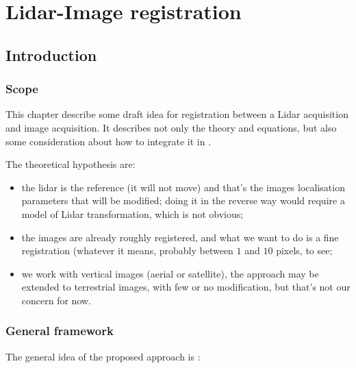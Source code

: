 \chapter{Lidar-Image registration}
\label{Chap:LidImRed}



\section{Introduction}

\subsection{Scope}

This chapter describe some draft idea for registration  between a Lidar
acquisition and image acquisition.  It describes not only the theory and equations,
but also some consideration about how to integrate it in \PPP.

The theoretical hypothesis are:

\begin{itemize}
   \item  the lidar is the reference (it will not move) and that's the images localisation parameters that will be modified; doing it in the reverse way would require
          a model of Lidar transformation, which is not obvious;

   \item  the images are already roughly registered, and what we want to do is a fine 
          registration (whatever it means, probably between $1$ and $10$ pixels, to see;
 
   \item  we work with vertical images (aerial or satellite),  the approach
          may be extended to terrestrial images, with few or no modification, but that's not our concern for now.
\end{itemize}


\subsection{General framework}

The general idea of the proposed approach is :

